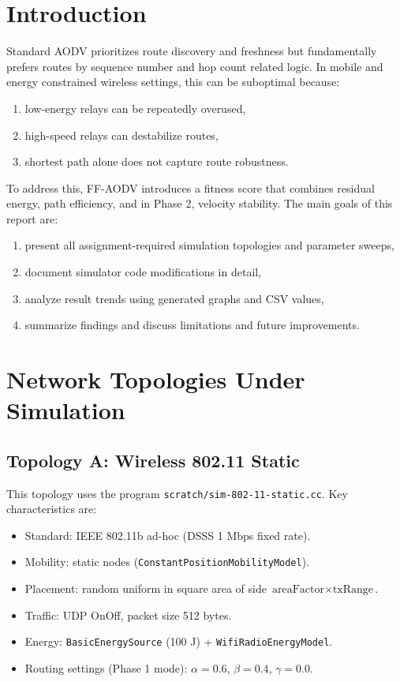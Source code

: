 \documentclass[12pt,a4paper]{article}
\begin{document}
\section{Introduction}
Standard AODV prioritizes route discovery and freshness but fundamentally prefers routes by sequence number and hop count related logic. In mobile and energy constrained wireless settings, this can be suboptimal because:
\begin{enumerate}[leftmargin=1.5em]
    \item low-energy relays can be repeatedly overused,
    \item high-speed relays can destabilize routes,
    \item shortest path alone does not capture route robustness.
\end{enumerate}

To address this, FF-AODV introduces a fitness score that combines residual energy, path efficiency, and in Phase 2, velocity stability. The main goals of this report are:
\begin{enumerate}[leftmargin=1.5em]
    \item present all assignment-required simulation topologies and parameter sweeps,
    \item document simulator code modifications in detail,
    \item analyze result trends using generated graphs and CSV values,
    \item summarize findings and discuss limitations and future improvements.
\end{enumerate}

\section{Network Topologies Under Simulation}

\subsection{Topology A: Wireless 802.11 Static}
This topology uses the program \texttt{scratch/sim-802-11-static.cc}. Key characteristics are:
\begin{itemize}[leftmargin=1.5em]
    \item Standard: IEEE 802.11b ad-hoc (DSSS 1 Mbps fixed rate).
    \item Mobility: static nodes (\texttt{ConstantPositionMobilityModel}).
    \item Placement: random uniform in square area of side $\text{areaFactor} \times \text{txRange}$.
    \item Traffic: UDP OnOff, packet size 512 bytes.
    \item Energy: \texttt{BasicEnergySource} (100 J) + \texttt{WifiRadioEnergyModel}.
    \item Routing settings (Phase 1 mode): $\alpha=0.6$, $\beta=0.4$, $\gamma=0.0$.
\end{itemize}
\end{document}
